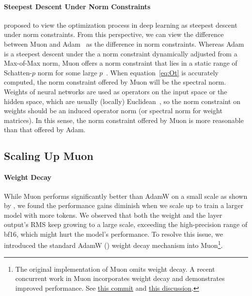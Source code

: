 \paragraph{Steepest Descent Under Norm Constraints}
\cite{bernstein2024oldoptimizernewnorm} proposed to view the optimization process in deep learning as steepest descent under norm constraints. From this perspective, we can view the difference between Muon and Adam~\citep{adam2015kingma, loshchilov2018decoupled} as the difference in norm constraints. Whereas Adam is a steepest descent under the a norm constraint dynamically adjusted from a Max-of-Max norm, Muon offers a norm constraint that lies in a static range of Schatten-$p$ norm for some large $p$~\citep{muoncase2024cesista}. When equation~\ref{eq:Ot} is accurately computed, the norm constraint offered by Muon will be the spectral norm. Weights of neural networks are used as operators on the input space or the hidden space, which are usually (locally) Euclidean~\citep{cesista2024firstordernormedopt}, so the norm constraint on weights should be an induced operator norm (or spectral norm for weight matrices). In this sense, the norm constraint offered by Muon is more reasonable than that offered by Adam.

\subsection{Scaling Up Muon}
\label{sec:analysis:rms}

\paragraph{Weight Decay}

While Muon performs significantly better than AdamW on a small scale as shown by \cite{jordan2024muon}, we found the performance gains diminish when we scale up to train a larger model with more tokens. We observed that both the weight and the layer output's RMS keep growing to a large scale, exceeding the high-precision range of bf16, which might hurt the model's performance. To resolve this issue, we introduced the standard AdamW (\cite{loshchilov2018decoupled}) weight decay mechanism into Muon\footnote{The original implementation of Muon omits weight decay. A recent concurrent work in Muon incorporates weight decay and demonstrates improved performance. See \href{https://github.com/KellerJordan/Muon/commit/e0ffefd4f7ea88f2db724caa2c7cfe859155995d}{this commit} and \href{https://x.com/kellerjordan0/status/1888320690543284449}{this discussion}.}. 


